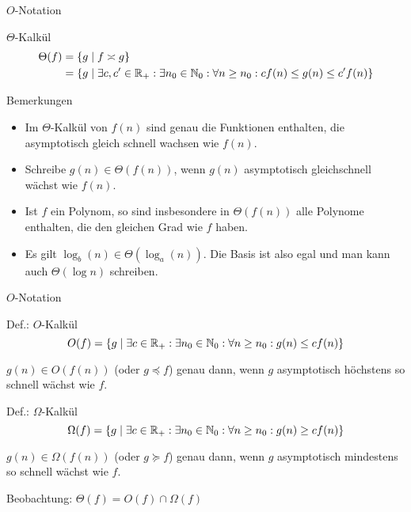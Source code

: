 \begin{frame}{$O$-Notation}
    \begin{block}{$\Theta$-Kalkül}
    	\begin{align*}
  			\Theta(f) &= \{ g \mid f \asymp g \} \\
  				   &= \{ g \mid \exists c,c'\in \mathbb{R}_+: \exists n_0\in \mathbb{N}_0: \forall  n\geq n_0: c f(n) \leq g(n) \leq c' f(n) \} 
		\end{align*}
    \end{block}

    \begin{exampleblock}{Bemerkungen}
    	\begin{itemize}
    		\item Im $\Theta$-Kalkül von $f(n)$ sind genau die Funktionen enthalten, die asymptotisch gleich schnell wachsen wie $f(n)$.
    		\item Schreibe $g(n) \in \Theta(f(n))$, wenn $g(n)$ asymptotisch gleichschnell wächst wie $f(n)$.
    		\item Ist $f$ ein Polynom, so sind insbesondere in $\Theta(f(n))$ alle Polynome enthalten, die den gleichen Grad wie $f$ haben.
    		\item Es gilt $\log_b(n) \in\Theta(\log_a(n))$. Die Basis ist also egal und man kann auch $\Theta(\log n)$ schreiben. %
    	\end{itemize}
    \end{exampleblock}
\end{frame}

\begin{frame}{$O$-Notation}
    \begin{block}{Def.: $O$-Kalkül}
    	\[
    		O(f) = \{ g \mid \exists c\in \mathbb{R}_+:\exists n_0\in\mathbb{N}_0: \forall n\geq n_0: g(n) \leq c f(n)\}
    	\]

    	$g(n) \in O(f(n))$ (oder $g \preceq f$) genau dann, wenn $g$ asymptotisch höchstens so schnell wächst wie $f$.
    \end{block}
\pause
    \begin{block}{Def.: $\Omega$-Kalkül}
    	\[
    		\Omega(f) = \{ g \mid \exists c\in \mathbb{R}_+:\exists n_0\in\mathbb{N}_0: \forall n\geq n_0: g(n) \geq c f(n)\}
    	\]
    	
    	$g(n) \in \Omega(f(n))$ (oder $g \succeq f$) genau dann, wenn $g$ asymptotisch mindestens so schnell wächst wie $f$.
    \end{block}
\pause
    Beobachtung: $\Theta(f) = O(f) \cap \Omega(f)$
\end{frame}

